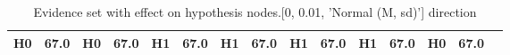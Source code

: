 \begin{table}
\begin{tabular}{c|cc|cc|cc|cc|cc|cc|cc}
\cellcolor{Bittersweet}H0&\cellcolor{Bittersweet}67.0&\cellcolor{Bittersweet}H0&\cellcolor{Bittersweet}67.0&\cellcolor{Bittersweet}H1&\cellcolor{Bittersweet}67.0&\cellcolor{Bittersweet}H1&\cellcolor{Bittersweet}67.0&\cellcolor{Bittersweet}H1&\cellcolor{Bittersweet}67.0&\cellcolor{Bittersweet}H1&\cellcolor{Bittersweet}67.0&\cellcolor{Bittersweet}H0&\cellcolor{Bittersweet}67.0\\\bottomrule\end{tabular}\caption{Evidence set with effect on hypothesis nodes.[0, 0.01, 'Normal (M, sd)'] direction}\end{table}